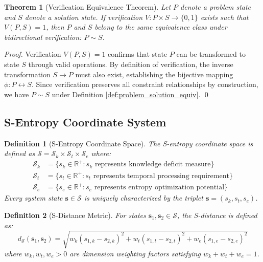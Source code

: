\documentclass[12pt,a4paper]{article}
\newtheorem{theorem}{Theorem}
\newtheorem{definition}{Definition}
\begin{document}
\begin{theorem}[Verification Equivalence Theorem]
\label{thm:verification_equivalence}
Let $P$ denote a problem state and $S$ denote a solution state. If verification $V: P \times S \to \{0,1\}$ exists such that $V(P,S) = 1$, then $P$ and $S$ belong to the same equivalence class under bidirectional verification: $P \sim S$.
\end{theorem}

\begin{proof}
Verification $V(P,S) = 1$ confirms that state $P$ can be transformed to state $S$ through valid operations. By definition of verification, the inverse transformation $S \to P$ must also exist, establishing the bijective mapping $\phi: P \leftrightarrow S$. Since verification preserves all constraint relationships by construction, we have $P \sim S$ under Definition \ref{def:problem_solution_equiv}. \qed
\end{proof}

\subsection{S-Entropy Coordinate System}

\begin{definition}[S-Entropy Coordinate Space]
\label{def:s_entropy_space}
The S-entropy coordinate space is defined as $\mathcal{S} = \mathcal{S}_k \times \mathcal{S}_t \times \mathcal{S}_e$ where:
\begin{align}
\mathcal{S}_k &= \{s_k \in \mathbb{R}^+ : s_k \text{ represents knowledge deficit measure}\} \\
\mathcal{S}_t &= \{s_t \in \mathbb{R}^+ : s_t \text{ represents temporal processing requirement}\} \\
\mathcal{S}_e &= \{s_e \in \mathbb{R}^+ : s_e \text{ represents entropy optimization potential}\}
\end{align}
Every system state $\mathbf{s} \in \mathcal{S}$ is uniquely characterized by the triplet $\mathbf{s} = (s_k, s_t, s_e)$.
\end{definition}

\begin{definition}[S-Distance Metric]
\label{def:s_distance}
For states $\mathbf{s}_1, \mathbf{s}_2 \in \mathcal{S}$, the S-distance is defined as:
\begin{equation}
d_{\mathcal{S}}(\mathbf{s}_1, \mathbf{s}_2) = \sqrt{w_k(s_{1,k} - s_{2,k})^2 + w_t(s_{1,t} - s_{2,t})^2 + w_e(s_{1,e} - s_{2,e})^2}
\end{equation}
where $w_k, w_t, w_e > 0$ are dimension weighting factors satisfying $w_k + w_t + w_e = 1$.
\end{definition}
\end{document}
